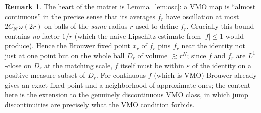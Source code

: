 \documentclass{amsart}
\theoremstyle{definition}
\newtheorem{remark}{Remark}
\begin{document}
\begin{remark}
The heart of the matter is Lemma~\ref{lem:osc}: a VMO map is ``almost continuous''
in the precise sense that its averages $f_r$ have oscillation at most
$2C_N\,\omega(2r)$ on balls of the \emph{same} radius $r$ used to define $f_r$.
Crucially this bound contains \emph{no} factor $1/r$ (which the naive Lipschitz
estimate from $|f|\le1$ would produce). Hence the Brouwer fixed point $x_r$ of
$f_r$ pins $f_r$ near the identity not just at one point but on the whole ball
$D_r$ of volume $\gtrsim r^N$; since $f$ and $f_r$ are $L^1$-close on $D_r$ at the
matching scale, $f$ itself must be within $\varepsilon$ of the identity on a
positive-measure subset of $D_r$. For continuous $f$ (which is VMO) Brouwer already
gives an exact fixed point and a neighborhood of approximate ones; the content here
is the extension to the genuinely discontinuous VMO class, in which jump
discontinuities are precisely what the VMO condition forbids.
\end{remark}
\end{document}
